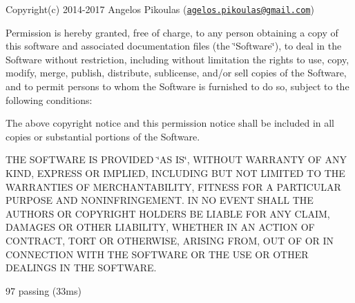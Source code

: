 Copyright(c) 2014-\/2017 Angelos Pikoulas (\href{mailto:agelos.pikoulas@gmail.com}{\tt agelos.\+pikoulas@gmail.\+com})

Permission is hereby granted, free of charge, to any person obtaining a copy of this software and associated documentation files (the \char`\"{}\+Software\char`\"{}), to deal in the Software without restriction, including without limitation the rights to use, copy, modify, merge, publish, distribute, sublicense, and/or sell copies of the Software, and to permit persons to whom the Software is furnished to do so, subject to the following conditions\+:

The above copyright notice and this permission notice shall be included in all copies or substantial portions of the Software.

T\+HE S\+O\+F\+T\+W\+A\+RE IS P\+R\+O\+V\+I\+D\+ED \char`\"{}\+A\+S I\+S\char`\"{}, W\+I\+T\+H\+O\+UT W\+A\+R\+R\+A\+N\+TY OF A\+NY K\+I\+ND, E\+X\+P\+R\+E\+SS OR I\+M\+P\+L\+I\+ED, I\+N\+C\+L\+U\+D\+I\+NG B\+UT N\+OT L\+I\+M\+I\+T\+ED TO T\+HE W\+A\+R\+R\+A\+N\+T\+I\+ES OF M\+E\+R\+C\+H\+A\+N\+T\+A\+B\+I\+L\+I\+TY, F\+I\+T\+N\+E\+SS F\+OR A P\+A\+R\+T\+I\+C\+U\+L\+AR P\+U\+R\+P\+O\+SE A\+ND N\+O\+N\+I\+N\+F\+R\+I\+N\+G\+E\+M\+E\+NT. IN NO E\+V\+E\+NT S\+H\+A\+LL T\+HE A\+U\+T\+H\+O\+RS OR C\+O\+P\+Y\+R\+I\+G\+HT H\+O\+L\+D\+E\+RS BE L\+I\+A\+B\+LE F\+OR A\+NY C\+L\+A\+IM, D\+A\+M\+A\+G\+ES OR O\+T\+H\+ER L\+I\+A\+B\+I\+L\+I\+TY, W\+H\+E\+T\+H\+ER IN AN A\+C\+T\+I\+ON OF C\+O\+N\+T\+R\+A\+CT, T\+O\+RT OR O\+T\+H\+E\+R\+W\+I\+SE, A\+R\+I\+S\+I\+NG F\+R\+OM, O\+UT OF OR IN C\+O\+N\+N\+E\+C\+T\+I\+ON W\+I\+TH T\+HE S\+O\+F\+T\+W\+A\+RE OR T\+HE U\+SE OR O\+T\+H\+ER D\+E\+A\+L\+I\+N\+GS IN T\+HE S\+O\+F\+T\+W\+A\+RE.

97 passing (33ms) 